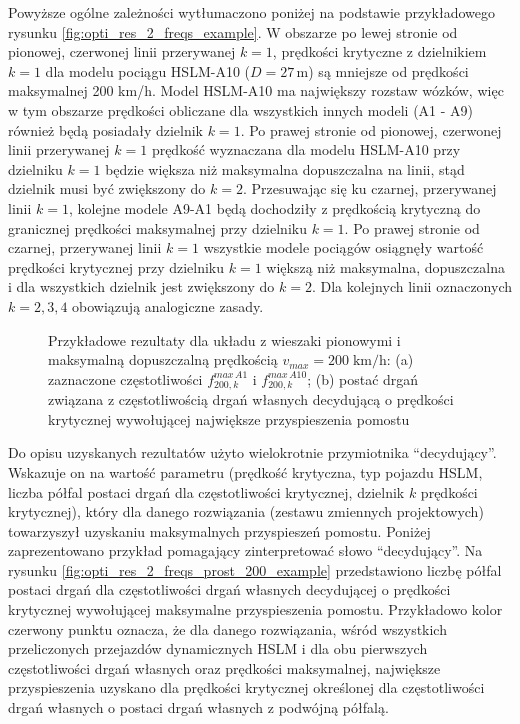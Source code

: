 Powyższe ogólne zależności wytłumaczono poniżej na podstawie przykładowego rysunku \ref{fig:opti_res_2_freqs_example}. W obszarze po lewej stronie od pionowej, czerwonej linii przerywanej $k=1$, prędkości krytyczne z dzielnikiem $k=1$ dla modelu pociągu HSLM-A10 ($D=27\, \mathrm{m}$) są mniejsze od prędkości maksymalnej 200 km/h. Model HSLM-A10 ma największy rozstaw wózków, więc w tym obszarze prędkości obliczane dla wszystkich innych modeli (A1 - A9) również będą posiadały dzielnik $k=1$. Po prawej stronie od pionowej, czerwonej linii przerywanej $k=1$ prędkość wyznaczana dla modelu HSLM-A10 przy dzielniku $k=1$ będzie większa niż maksymalna dopuszczalna na linii, stąd dzielnik musi być zwiększony do $k=2$. Przesuwając się ku czarnej, przerywanej linii $k=1$, kolejne modele A9-A1 będą dochodziły z prędkością krytyczną do granicznej prędkości maksymalnej przy dzielniku $k=1$. Po prawej stronie od czarnej, przerywanej linii $k=1$ wszystkie modele pociągów osiągnęły wartość prędkości krytycznej przy dzielniku $k=1$ większą niż maksymalna, dopuszczalna i dla wszystkich dzielnik jest zwiększony do $k=2$. Dla kolejnych linii oznaczonych $k=2,3,4$ obowiązują analogiczne zasady.


\begin{figure}[hbt!]
	\centering
	
	
	\caption{Przykładowe rezultaty dla układu z wieszaki pionowymi i maksymalną dopuszczalną prędkością $v_{max}=200\;\mathrm{km/h}$: (a) zaznaczone częstotliwości $f_{200,k}^{max\,A1}$ i $f_{200,k}^{max\,A10}$; (b) postać drgań związana z częstotliwością drgań własnych decydującą o prędkości krytycznej wywołującej największe przyspieszenia pomostu }
	
\end{figure}

Do opisu uzyskanych rezultatów użyto wielokrotnie przymiotnika \enquote{decydujący}. Wskazuje on na wartość parametru (prędkość krytyczna, typ pojazdu HSLM, liczba półfal postaci drgań dla częstotliwości krytycznej, dzielnik $k$ prędkości krytycznej), który dla danego rozwiązania (zestawu zmiennych projektowych) towarzyszył uzyskaniu maksymalnych przyspieszeń pomostu. Poniżej zaprezentowano przykład pomagający zinterpretować słowo \enquote{decydujący}. Na rysunku \ref{fig:opti_res_2_freqs_prost_200_example} przedstawiono liczbę półfal postaci drgań dla częstotliwości drgań własnych decydującej o prędkości krytycznej wywołującej maksymalne przyspieszenia pomostu. Przykładowo kolor czerwony punktu oznacza, że dla danego rozwiązania, wśród wszystkich przeliczonych przejazdów dynamicznych HSLM i dla obu pierwszych częstotliwości drgań własnych oraz prędkości maksymalnej, największe przyspieszenia uzyskano dla prędkości krytycznej określonej dla częstotliwości drgań własnych o postaci drgań własnych z podwójną półfalą.

